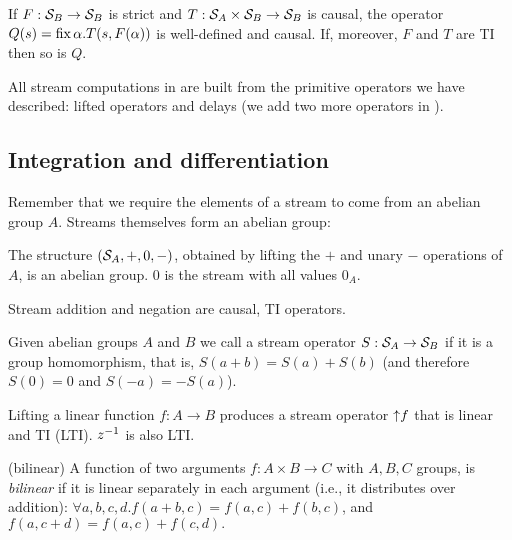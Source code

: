 \begin{corollary}\label{feedback-semantics}
\label{cor-loop}
If $F: \mathcal{S}_{B} \to \mathcal{S}_{B}$ is strict and $T: \mathcal{S}_{A} \times \mathcal{S}_{B} \to \mathcal{S}_{B}$ is causal,
the operator $Q(s)=\mbox{fix}\,\alpha.T(s,F(\alpha))$ is well-defined and causal. 
If, moreover, $F$ and $T$ are TI then so is $Q$.
\end{corollary}

All stream computations in \dbsp are built from the primitive operators 
we have described: lifted operators and delays (we add two more operators in ).


\subsection{Integration and differentiation}\label{sec:abelianstreams}

Remember that we require the elements of a stream to come from an abelian group $A$.  
Streams themselves form an abelian group:

\begin{proposition}
The structure $(\mathcal{S}_{A},+,0,-)$, obtained by lifting the $+$ and unary $-$ operations of $A$, 
is an abelian group.  0 is the stream with all values $0_A$.
\end{proposition}

\noindent
Stream addition and negation are causal, TI operators.

\begin{definition}
Given abelian groups $A$ and $B$ we call a stream operator 
$S: \mathcal{S}_{A} \rightarrow \mathcal{S}_{B}$  if it is a group homomorphism, that is,
$S(a+b)=S(a)+S(b)$ (and therefore $S(0)=0$ and $S(-a)=-S(a)$). 
\end{definition}

Lifting a linear function $f: A \to B$ produces
a stream operator ${\uparrow}f$ that is linear and TI (LTI).
$z^{-1}$ is also LTI.   

\begin{definition}(bilinear)
A function of two arguments $f: A \times B \to C$ with $A, B, C$ groups, is \emph{bilinear} 
if it is linear separately in each argument (i.e., it distributes over addition): 
$\forall a, b, c, d . f(a+b, c) = f(a, c) + f(b, c)$, and $f(a, c+d) = f(a, c) + f(c, d).$
\end{definition}

